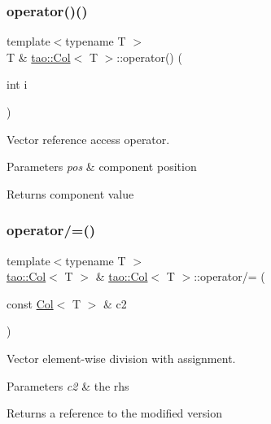 \subsubsection{\texorpdfstring{operator()()}{operator()()}\hspace{0.1cm}{\footnotesize\ttfamily [2/2]}}
{\footnotesize\ttfamily template$<$typename T $>$ \\
T \& \mbox{\hyperlink{classtao_1_1_col}{tao\+::\+Col}}$<$ T $>$\+::operator() (\begin{DoxyParamCaption}\item[{int}]{i }\end{DoxyParamCaption})}



Vector reference access operator. 


\begin{DoxyParams}{Parameters}
{\em pos} & component position \\
\hline
\end{DoxyParams}
\begin{DoxyReturn}{Returns}
component value 
\end{DoxyReturn}
\mbox{\label{classtao_1_1_col_ab51f1d091fdb1b5a6a4199f4253ecfaa}} 
\subsubsection{\texorpdfstring{operator/=()}{operator/=()}\hspace{0.1cm}{\footnotesize\ttfamily [1/2]}}
{\footnotesize\ttfamily template$<$typename T $>$ \\
\mbox{\hyperlink{classtao_1_1_col}{tao\+::\+Col}}$<$ T $>$ \& \mbox{\hyperlink{classtao_1_1_col}{tao\+::\+Col}}$<$ T $>$\+::operator/= (\begin{DoxyParamCaption}\item[{const \mbox{\hyperlink{classtao_1_1_col}{Col}}$<$ T $>$ \&}]{c2 }\end{DoxyParamCaption})}



Vector element-\/wise division with assignment. 


\begin{DoxyParams}{Parameters}
{\em c2} & the rhs \\
\hline
\end{DoxyParams}
\begin{DoxyReturn}{Returns}
a reference to the modified version 
\end{DoxyReturn}
\mbox{\label{classtao_1_1_col_abddd1e9737a0cafd50a52fd5063e4851}} 
